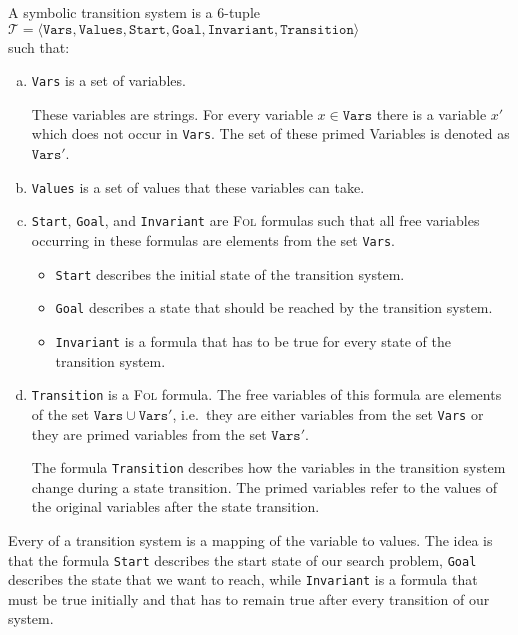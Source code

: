 \begin{Definition}
  A symbolic transition system is a 6-tuple
  \\[0.2cm]
  \hspace*{1.3cm}
  $\mathcal{T} = \langle \mathtt{Vars}, \mathtt{Values}, \mathtt{Start}, \mathtt{Goal}, \mathtt{Invariant}, \mathtt{Transition} \rangle$
  \\[0.2cm]
  such that:
  \begin{enumerate}[(a)]
  \item \texttt{Vars} is a set of variables.

        These variables are strings.  For every variable $x \in \texttt{Vars}$ there is a 
        variable $x'$ which does not occur in \texttt{Vars}.  The set of these primed Variables is denoted as
        $\mathtt{Vars}'$.
  \item \texttt{Values} is a set of values that these variables can take.
  \item \texttt{Start}, \texttt{Goal}, and \texttt{Invariant} are \textsc{Fol} formulas such that all free
         variables occurring in these formulas are elements from the set \texttt{Vars}.
         \begin{itemize}
         \item \texttt{Start} describes the initial state of the transition system.
         \item \texttt{Goal} describes a state that should be reached by the transition system.
         \item \texttt{Invariant} is a formula that has to be true for every state of the transition system.
         \end{itemize}
  \item \texttt{Transition} is a \textsc{Fol} formula.  The free variables of this formula are elements of
        the set $\texttt{Vars} \cup \mathtt{Vars}'$, i.e.~they are either variables from the set \texttt{Vars}
        or they are primed variables from the set $\mathtt{Vars}'$.

        The formula \texttt{Transition} describes how the variables in the transition system change during a
        state transition.  The primed variables refer to the values of the original variables after the
        state transition.
  \end{enumerate}
\end{Definition}
Every  of a transition system is a mapping of the variable to values.
The idea is that the formula \texttt{Start} describes the start state of our search problem, \texttt{Goal}
describes the state that we want to reach, while \texttt{Invariant} is a formula that must be true initially
and that has to remain true after every transition of our system.


